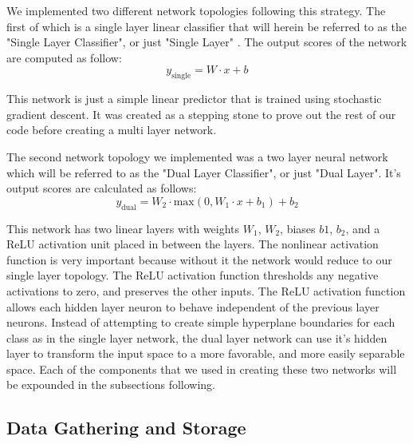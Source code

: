\documentclass[conference]{IEEEtran}
\begin{document}
We implemented two different network topologies following this strategy. The first of which is a single layer linear classifier that will herein be referred to as the "Single Layer Classifier", or just "Single Layer" . The output scores of the network are computed as follow:
\begin{equation}\label{eq:singleLayer}
y_{\text{single}}=W \cdot x + b
\end{equation}

This network is just a simple linear predictor that is trained using stochastic gradient descent. It was created as a stepping stone to prove out the rest of our code before creating a multi layer network. 

The second network topology we implemented was a two layer neural network which will be referred to as the "Dual Layer Classifier", or just "Dual Layer". It's output scores are calculated as follows: 
\begin{equation}\label{eq:dualLayer}
y_{\text{dual}}=W_2 \cdot \text{max}(0, W_1 \cdot x + b_1) + b_2
\end{equation}

This network has two linear layers with weights $W_1$, $W_2$, biases $b1$, $b_2$, and a ReLU activation unit placed in between the layers. The nonlinear activation function is very important because without it the network would reduce to our single layer topology. The ReLU activation function thresholds any negative activations to zero, and preserves the other inputs. The ReLU activation function allows each hidden layer neuron to behave independent of the previous layer neurons. Instead of attempting to create simple hyperplane boundaries for each class as in the single layer network, the dual layer network can use it's hidden layer to transform the input space to a more favorable, and more easily separable space. Each of the components that we used in creating these two networks will be expounded in the subsections following.


\subsection{Data Gathering and Storage}
\end{document}
